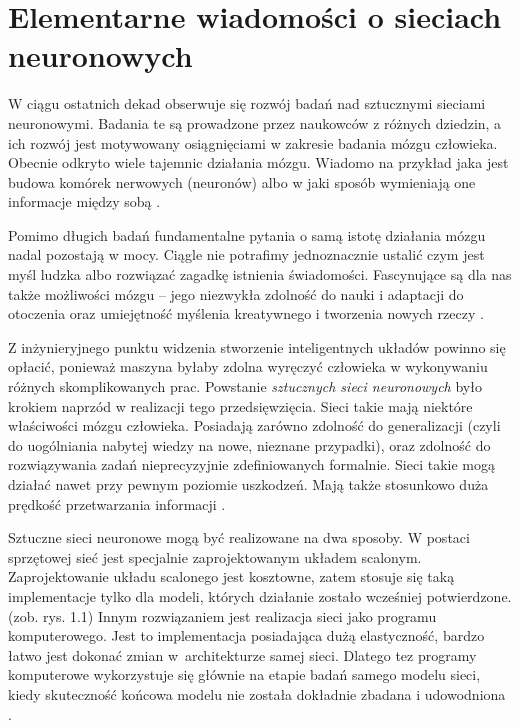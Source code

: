 \chapter{Elementarne wiadomości o sieciach neuronowych}

W ciągu ostatnich dekad obserwuje się rozwój badań nad sztucznymi sieciami neuronowymi. Badania te są prowadzone przez naukowców z różnych dziedzin, a ich rozwój jest motywowany osiągnięciami w zakresie badania mózgu człowieka. Obecnie odkryto wiele tajemnic działania mózgu. Wiadomo na przykład jaka jest budowa komórek nerwowych (neuronów) albo w jaki sposób wymieniają one informacje między sobą \citep[s. 13]{Kosinski2017}.

Pomimo długich badań fundamentalne pytania o samą istotę działania mózgu nadal pozostają w mocy. Ciągle nie potrafimy jednoznacznie ustalić czym jest myśl ludzka albo rozwiązać  zagadkę istnienia świadomości. Fascynujące są dla nas także możliwości mózgu -- jego niezwykła zdolność do nauki i adaptacji do otoczenia oraz umiejętność myślenia kreatywnego i tworzenia nowych rzeczy \citep[s. 14]{Kosinski2017}.

Z inżynieryjnego punktu widzenia stworzenie inteligentnych układów powinno się opłacić, ponieważ maszyna byłaby zdolna wyręczyć człowieka w wykonywaniu różnych skomplikowanych prac. Powstanie \textit{sztucznych sieci neuronowych} było krokiem naprzód w realizacji tego przedsięwzięcia. Sieci takie mają niektóre właściwości mózgu człowieka. Posiadają zarówno zdolność do generalizacji (czyli do uogólniania nabytej wiedzy na nowe, nieznane przypadki), oraz zdolność do rozwiązywania zadań nieprecyzyjnie zdefiniowanych formalnie. Sieci takie mogą działać nawet przy pewnym poziomie uszkodzeń. Mają także stosunkowo duża prędkość przetwarzania informacji \citep[s. 15-16]{Kosinski2017}.

Sztuczne sieci neuronowe mogą być realizowane na dwa sposoby. W postaci sprzętowej sieć jest specjalnie zaprojektowanym układem scalonym. Zaprojektowanie układu scalonego jest kosztowne, zatem stosuje się taką implementacje tylko dla modeli, których działanie zostało wcześniej potwierdzone. (zob. rys. 1.1) Innym rozwiązaniem jest realizacja sieci jako programu komputerowego. Jest to implementacja posiadająca dużą elastyczność, bardzo łatwo jest dokonać zmian w~architekturze samej sieci. Dlatego tez programy komputerowe wykorzystuje się głównie na etapie badań samego modelu sieci, kiedy skuteczność końcowa modelu nie została dokładnie zbadana i udowodniona \citep[s. 15]{Kosinski2017}.

